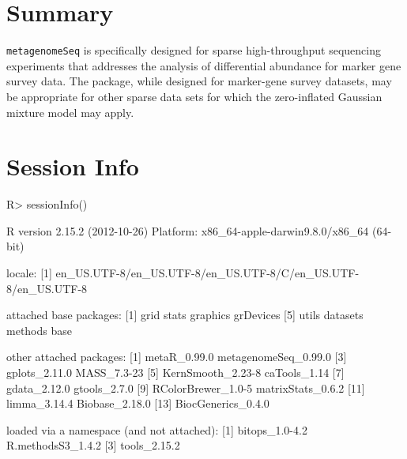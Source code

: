 \documentclass[a4paper,12pt]{article}
\begin{document}
\section{Summary}

\texttt{metagenomeSeq} is specifically designed for sparse high-throughput sequencing experiments that addresses the analysis of differential abundance for marker gene survey data. The package, while designed for marker-gene survey datasets, may be appropriate for other sparse data sets for which the zero-inflated Gaussian mixture model may apply.

\section{Session Info}
\begin{Schunk}
\begin{Sinput}
R> sessionInfo()
\end{Sinput}
\begin{Soutput}
R version 2.15.2 (2012-10-26)
Platform: x86_64-apple-darwin9.8.0/x86_64 (64-bit)

locale:
[1] en_US.UTF-8/en_US.UTF-8/en_US.UTF-8/C/en_US.UTF-8/en_US.UTF-8

attached base packages:
[1] grid      stats     graphics  grDevices
[5] utils     datasets  methods   base     

other attached packages:
 [1] metaR_0.99.0         metagenomeSeq_0.99.0
 [3] gplots_2.11.0        MASS_7.3-23         
 [5] KernSmooth_2.23-8    caTools_1.14        
 [7] gdata_2.12.0         gtools_2.7.0        
 [9] RColorBrewer_1.0-5   matrixStats_0.6.2   
[11] limma_3.14.4         Biobase_2.18.0      
[13] BiocGenerics_0.4.0  

loaded via a namespace (and not attached):
[1] bitops_1.0-4.2    R.methodsS3_1.4.2
[3] tools_2.15.2     
\end{Soutput}
\end{Schunk}

\end{document}
